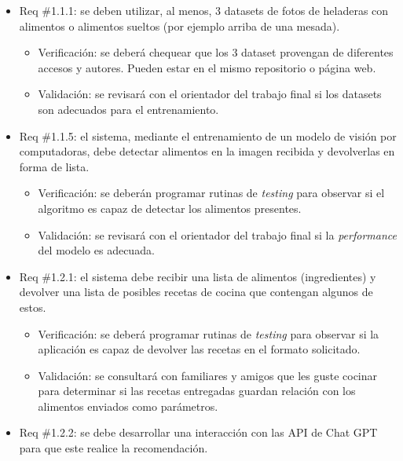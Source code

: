 \documentclass[
11pt, %
]{charter}
\begin{document}
\begin{itemize} 

\item Req \#1.1.1: se deben utilizar, al menos, 3 datasets de fotos de heladeras con alimentos o alimentos sueltos (por ejemplo arriba de una mesada).

\begin{itemize}
	\item Verificación: se deberá chequear que los 3 dataset provengan de diferentes accesos y autores. Pueden estar en el mismo repositorio o página web.
	\item Validación: se revisará con el orientador del trabajo final si los datasets son adecuados para el entrenamiento.
\end{itemize}

\item Req \#1.1.5: el sistema, mediante el entrenamiento de un modelo de visión por computadoras, debe detectar alimentos en la imagen recibida y devolverlas en forma de lista.

\begin{itemize}
	\item Verificación: se deberán programar rutinas de \textit{testing} para observar si el algoritmo es capaz de detectar los alimentos presentes.
	\item Validación: se revisará con el orientador del trabajo final si la \textit{performance} del modelo es adecuada.
\end{itemize}

\item Req \#1.2.1: el sistema debe recibir una lista de alimentos (ingredientes) y devolver una lista de posibles recetas de cocina que contengan algunos de estos. 

\begin{itemize}
	\item Verificación: se deberá programar rutinas de \textit{testing} para observar si la aplicación es capaz de devolver las recetas en el formato solicitado.
	\item Validación: se consultará con familiares y amigos que les guste cocinar para determinar si las recetas entregadas guardan relación con los alimentos enviados como parámetros.
\end{itemize}

\item Req \#1.2.2: se debe desarrollar una interacción con las API de Chat GPT para que este realice la recomendación.


\end{itemize}
\end{document}
